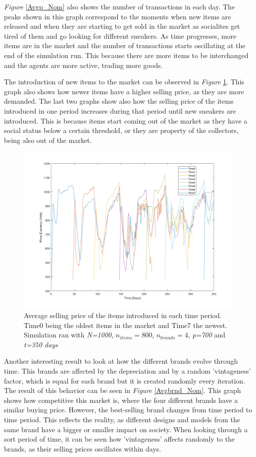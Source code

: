 \documentclass[12pt]{article}
\begin{document}
\textit{Figure} \ref{Avgp_Nom} also shows the number of transactions in each day. The peaks shown in this graph correspond to the moments when new items are released and when they are starting to get sold in the market as socialites get tired of them and go looking for different sneakers. As time progresses, more items are in the market and the number of transactions starts oscillating at the end of the simulation run. This because there are more items to be interchanged and the agents are more active, trading more goods.

The introduction of new items to the market can be observed in \textit{Figure} \ref{Avgtim_Nom}. This graph also shows how newer items have a higher selling price, as they are more demanded. The last two graphs show also how the selling price of the items introduced in one period increases during that period until new sneakers are introduced. This is because items start coming out of the market as they have a social status below a certain threshold, or they are property of the collectors, being also out of the market.

\begin{figure}
    \centering
    \includegraphics[width=0.6\columnwidth]{Nominal_Out/timepnom.png}
    \caption{Average selling price of the items introduced in each time period. Time0 being the oldest items in the market and Time7 the newest. Simulation ran with \textit{N=1000}, \textit{$n_{items}=800$}, \textit{$n_{brands}=4$}, \textit{p=700} and \textit{t=350 days}}
    \label{Avgtim_Nom}
\end{figure}

Another interesting result to look at how the different brands evolve through time. This brands are affected by the depreciation and by a random 'vintageness' factor, which is equal for each brand but it is created randomly every iteration. The result of this behavior can be seen in \textit{Figure} \ref{Avgbrnd_Nom}. This graph shows how competitive this market is, where the four different brands have a similar buying price. However, the best-selling brand changes from time period to time period. This reflects the reality, as different designs and models from the same brand have a bigger or smaller impact on society. When looking through a sort period of time, it can be seen how 'vintageness' affects randomly to the brands, as their selling prices oscillates within days.
\end{document}

